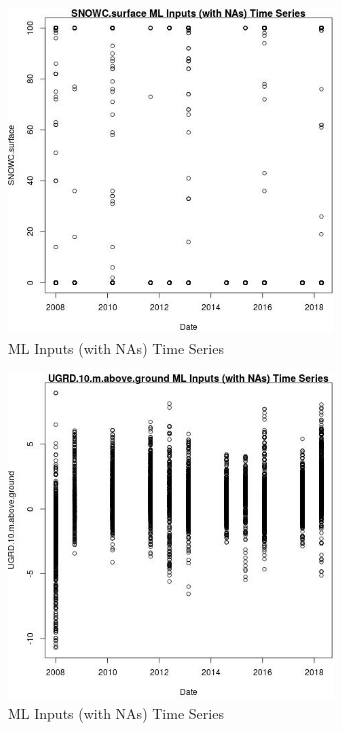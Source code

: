 \begin{figure} 
\centering  
\includegraphics[width=0.77\textwidth]{Code_Outputs/Report_ML_input_PM25_Step4_part_e_de_duplicated_aves_compiled_2019-05-18wNAs_SNOWCsurfacevDate.jpg} 
\caption{\label{fig:Report_ML_input_PM25_Step4_part_e_de_duplicated_aves_compiled_2019-05-18wNAsSNOWCsurfacevDate}ML Inputs (with NAs) Time Series} 
\end{figure} 
 

\clearpage 

\begin{figure} 
\centering  
\includegraphics[width=0.77\textwidth]{Code_Outputs/Report_ML_input_PM25_Step4_part_e_de_duplicated_aves_compiled_2019-05-18wNAs_UGRD10mabovegroundvDate.jpg} 
\caption{\label{fig:Report_ML_input_PM25_Step4_part_e_de_duplicated_aves_compiled_2019-05-18wNAsUGRD10mabovegroundvDate}ML Inputs (with NAs) Time Series} 
\end{figure} 
 

